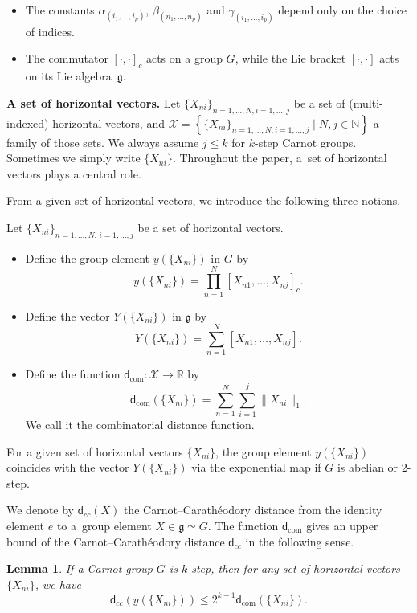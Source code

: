 \documentclass[pdftex]{sigma}
\numberwithin{equation}{section}
\newtheorem{Lemma}[Theorem]{Lemma}
\newcommand{\g}{\mathfrak{g}}
\newcommand{\R}{\mathbb{R}}
\newcommand{\N}{\mathbb{N}}
\begin{document}
\begin{Remark}\qquad
\begin{itemize}\itemsep=0pt
 \item The constants $\alpha_{(i_1,\dots,i_p)}$,
$\beta_{(n_1,\dots,n_p)}$ and $\gamma_{(i_1,\dots,i_p)}$ depend only on the choice of indices.
\item The commutator $[\cdot,\cdot]_c$ acts on a group $G$,
while the Lie bracket $[\cdot,\cdot]$ acts on its Lie algebra~$\g$.
\end{itemize}
\end{Remark}

{\bf A set of horizontal vectors.}
Let $\{X_{ni}\}_{n=1,\dots,N,i=1,\dots,j}$ be a set of (multi-indexed) horizontal vectors,
and $\mathcal{X}=\left\{\{X_{ni}\}_{n=1,\dots,N,i=1,\dots,j}\mid N,j\in\N\right\}$ a family of those sets.
We always assume $j\leq k$ for $k$-step Carnot groups.
Sometimes we simply write $\{X_{ni}\}$.
Throughout the paper,
a~set of horizontal vectors plays a central role.

From a given set of horizontal vectors,
we introduce the following three notions.

\begin{Definition}
 Let $\{X_{ni}\}_{n=1,\dots,N,\,i=1,\dots,j}$ be a set of horizontal vectors.
\begin{itemize}\itemsep=0pt
 \item[$1.$] Define the group element $y(\{X_{ni}\})$ in $G$ by
 \[
 y(\{X_{ni}\})=\prod_{n=1}^N [X_{n1},\dots,X_{nj}]_c.
 \]

 \item[$2.$] Define the vector $Y(\{X_{ni}\})$ in $\g$ by
 \[
 Y(\{X_{ni}\})=\sum_{n=1}^N[X_{n1},\dots,X_{nj}].
 \]
 \item[$3.$] Define the function $\mathsf{d}_{\mathrm{com}}\colon \mathcal{X}\to\R$ by
 \[
 \mathsf{d}_{\mathrm{com}}(\{X_{ni}\})=\sum_{n=1}^N\sum_{i=1}^j\|X_{ni}\|_1.
 \]
 We call it the combinatorial distance function.
\end{itemize}
\end{Definition}

\begin{Remark}\label{rmk2step}
 For a given set of horizontal vectors $\{X_{ni}\}$,
the group element $y(\{X_{ni}\})$ coincides with the vector $Y(\{X_{ni}\})$ via the exponential map if $G$ is abelian or $2$-step.
\end{Remark}

We denote by $\mathsf{d}_{cc}(X)$ the Carnot--Carath\'eodory distance from the identity element $e$ to a~group element $X\in\g\simeq G$.
The function $\mathsf{d}_{\mathrm{com}}$ gives an upper bound of the Carnot--Carath\'eodory distance $\mathsf{d}_{cc}$ in the following sense.
\begin{Lemma}\label{lemcom}
If a Carnot group $G$ is $k$-step,
then for any set of horizontal vectors $\{X_{ni}\}$,
we have
\[
\mathsf{d}_{cc}(y(\{X_{ni}\}))\leq 2^{k-1}\mathsf{d}_{\mathrm{com}}(\{X_{ni}\}).
\]
\end{Lemma}
\end{document}
